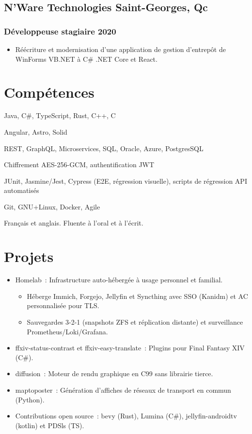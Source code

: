 \documentclass[10pt]{article} %
\begin{document}
\subsection{N'Ware Technologies \hfill Saint-Georges, Qc}
\subsubsection{Développeuse stagiaire \hfill 2020}
\begin{itemize}
	\item Réécriture et modernisation d'une application de gestion d'entrepôt
        de WinForms VB.NET à C\# .NET Core et React.
\end{itemize}


\section{Compétences}
\begin{description}[itemsep=0pt]
	\item[Programmation] Java, C\#, TypeScript, Rust, C++, C
	\item[Frontend] Angular, Astro, Solid
	\item[Backend] REST, GraphQL, Microservices, SQL, Oracle, Azure, PostgresSQL
	\item[Sécurité] Chiffrement AES-256-GCM, authentification JWT
	\item[Tests] JUnit, Jasmine/Jest, Cypress (E2E, régression visuelle),
        scripts de régression API automatisés
	\item[Outils et pratiques] Git, GNU+Linux, Docker, Agile
	\item[Langues] Français et anglais. Fluente à l'oral et à l'écrit.
\end{description}


\section{Projets}
\begin{itemize}
	\item Homelab~: Infrastructure auto-hébergée à usage personnel et familial.
		\begin{itemize}
			\item Héberge Immich, Forgejo, Jellyfin et Syncthing avec SSO
			(Kanidm) et AC personnalisée pour TLS.
			\item Sauvegardes 3-2-1 (snapshots ZFS et réplication distante) et
			surveillance Prometheus/Loki/Grafana.
		\end{itemize}
    \item ffxiv-status-contrast et ffxiv-easy-translate~: Plugins pour Final
        Fantasy XIV (C\#).
	\item diffusion~: Moteur de rendu graphique en C99 sans librairie tierce.
    \item maptoposter~: Génération d'affiches de réseaux de transport en commun
        (Python).
    \item Contributions open source~: bevy (Rust), Lumina (C\#),
        \mbox{jellyfin-androidtv} (kotlin) et PDSls (TS).
\end{itemize}
\end{document}
